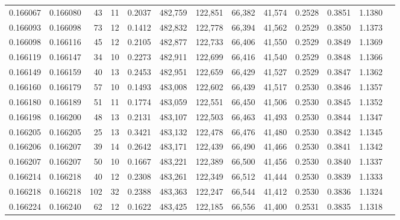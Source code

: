\begin{tabular}{rrrrrrrrrrrrr}
0.166067 & 0.166080 &    43 &  11 &                                     0.2037 & 482,759 & 122,851 &  66,382 &  41,574 & 0.2528 & 0.3851 & 1.1380 \\
0.166093 & 0.166098 &    73 &  12 &                                     0.1412 & 482,832 & 122,778 &  66,394 &  41,562 & 0.2529 & 0.3850 & 1.1373 \\
0.166098 & 0.166116 &    45 &  12 &                                     0.2105 & 482,877 & 122,733 &  66,406 &  41,550 & 0.2529 & 0.3849 & 1.1369 \\
0.166119 & 0.166147 &    34 &  10 &                                     0.2273 & 482,911 & 122,699 &  66,416 &  41,540 & 0.2529 & 0.3848 & 1.1366 \\
0.166149 & 0.166159 &    40 &  13 &                                     0.2453 & 482,951 & 122,659 &  66,429 &  41,527 & 0.2529 & 0.3847 & 1.1362 \\
0.166160 & 0.166179 &    57 &  10 &                                     0.1493 & 483,008 & 122,602 &  66,439 &  41,517 & 0.2530 & 0.3846 & 1.1357 \\
0.166180 & 0.166189 &    51 &  11 &                                     0.1774 & 483,059 & 122,551 &  66,450 &  41,506 & 0.2530 & 0.3845 & 1.1352 \\
0.166198 & 0.166200 &    48 &  13 &                                     0.2131 & 483,107 & 122,503 &  66,463 &  41,493 & 0.2530 & 0.3844 & 1.1347 \\
0.166205 & 0.166205 &    25 &  13 &                                     0.3421 & 483,132 & 122,478 &  66,476 &  41,480 & 0.2530 & 0.3842 & 1.1345 \\
0.166206 & 0.166207 &    39 &  14 &                                     0.2642 & 483,171 & 122,439 &  66,490 &  41,466 & 0.2530 & 0.3841 & 1.1342 \\
0.166207 & 0.166207 &    50 &  10 &                                     0.1667 & 483,221 & 122,389 &  66,500 &  41,456 & 0.2530 & 0.3840 & 1.1337 \\
0.166214 & 0.166218 &    40 &  12 &                                     0.2308 & 483,261 & 122,349 &  66,512 &  41,444 & 0.2530 & 0.3839 & 1.1333 \\
0.166218 & 0.166218 &   102 &  32 &                                     0.2388 & 483,363 & 122,247 &  66,544 &  41,412 & 0.2530 & 0.3836 & 1.1324 \\
0.166224 & 0.166240 &    62 &  12 &                                     0.1622 & 483,425 & 122,185 &  66,556 &  41,400 & 0.2531 & 0.3835 & 1.1318 \\

\end{tabular}
